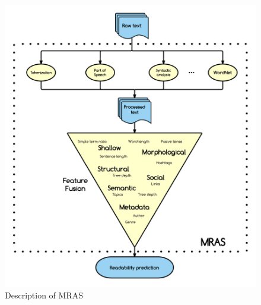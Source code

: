 \documentclass[12pt]{article}
\begin{document}



\begin{figure}[h]
\includegraphics[width=\textwidth]{pipelineGraph}
\caption{Description of MRAS}
\label{fig:pipeline}
\end{figure}
\end{document}
